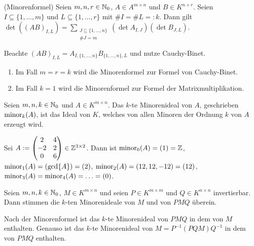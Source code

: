 \documentclass[../../main.tex]{subfiles}
\begin{document}
\begin{kor}\label{17.2.8}
    (Minorenformel) Seien $m,n,r\in \mathbb N_0$, $A\in A^{m\times n}$ und $B\in K^{n\times r}$. Seien $I\subseteq\{1,\ldots ,m\}$ und $L\subseteq\{1,\ldots ,r\}$ mit $\# I=\#L=:k$. Dann gilt\\ $\det((AB)_{I,L})=\sum_{\substack{J\subseteq\{1,\ldots ,n\}\\\#J=m}}(\det A_{I,J})(\det B_{J,L})$.
\end{kor}
\begin{cproof}
    Beachte $(AB)_{I,L}=A_{I,\{1,\ldots ,n\}}B_{\{1,\ldots ,n\},L}$ und nutze Cauchy-Binet.
\end{cproof}

\begin{bem}\label{17.2.9}
    \begin{enumerate}[\normalfont(a)]
        \item Im Fall $m=r=k$ wird die Minorenformel zur Formel von Cauchy-Binet.
        \item Im Fall $k=1$ wird die Minorenformel zur Formel der Matrixmultiplikation.
    \end{enumerate}
\end{bem}

\begin{df}\label{17.2.10}
    Seien $m,n,k\in \mathbb N_0$ und $A\in K^{m\times n}$. Das $k$-te Minorenideal von $A$, geschrieben $\operatorname{minor}_k(A)$, ist das Ideal von $K$, welches von allen Minoren der Ordnung $k$ von $A$ erzeugt wird.
\end{df}

\begin{bsp}\label{17.2.11}
    Sei $A:=\begin{pmatrix}2&4\\-2&2\\0&6\end{pmatrix}\in \mathbb Z^{3\times 2}$. Dann ist $\operatorname{minor}_0(A)=(1)=\mathbb Z$, $\operatorname{minor}_1(A)=(\gcd\{A\})=(2)$, $\operatorname{minor}_2(A)=(12,12,-12)=(12)$, $\operatorname{minor}_3(A)=\operatorname{minor}_4(A)=\ldots =(0)$.
\end{bsp}

\begin{kor}\label{17.2.12}
    Seien $m,n,k\in\mathbb N_0$, $M\in K^{m\times n}$ und seien $P\in K^{m\times m}$ und $Q\in K^{n\times n}$ invertierbar. Dann stimmen die $k$-ten Minorenideale von $M$ und von $PMQ$ überein. 
\end{kor}
\begin{cproof}
    Nach der Minorenformel ist das $k$-te Minorenideal von $PMQ$ in dem von $M$ enthalten. Genauso ist das $k$-te Minorenideal von $M=P^{-1}(PQM)Q^{-1}$ in dem von $PMQ$ enthalten.
\end{cproof}
\end{document}
